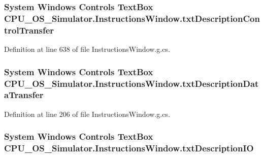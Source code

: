 \subsubsection[{txt\+Description\+Control\+Transfer}]{\setlength{\rightskip}{0pt plus 5cm}System Windows Controls Text\+Box C\+P\+U\+\_\+\+O\+S\+\_\+\+Simulator.\+Instructions\+Window.\+txt\+Description\+Control\+Transfer\hspace{0.3cm}{\ttfamily [package]}}\label{class_c_p_u___o_s___simulator_1_1_instructions_window_af8667a9cb444eb6aaa84349fe194b853}


Definition at line 638 of file Instructions\+Window.\+g.\+cs.

\hypertarget{class_c_p_u___o_s___simulator_1_1_instructions_window_a58152c12c2022edc73b39c1f95ec7ba4}{}
\subsubsection[{txt\+Description\+Data\+Transfer}]{\setlength{\rightskip}{0pt plus 5cm}System Windows Controls Text\+Box C\+P\+U\+\_\+\+O\+S\+\_\+\+Simulator.\+Instructions\+Window.\+txt\+Description\+Data\+Transfer\hspace{0.3cm}{\ttfamily [package]}}\label{class_c_p_u___o_s___simulator_1_1_instructions_window_a58152c12c2022edc73b39c1f95ec7ba4}


Definition at line 206 of file Instructions\+Window.\+g.\+cs.

\hypertarget{class_c_p_u___o_s___simulator_1_1_instructions_window_a278020eeca6ae302ab5530cca856acde}{}
\subsubsection[{txt\+Description\+I\+O}]{\setlength{\rightskip}{0pt plus 5cm}System Windows Controls Text\+Box C\+P\+U\+\_\+\+O\+S\+\_\+\+Simulator.\+Instructions\+Window.\+txt\+Description\+I\+O\hspace{0.3cm}{\ttfamily [package]}}\label{class_c_p_u___o_s___simulator_1_1_instructions_window_a278020eeca6ae302ab5530cca856acde}



